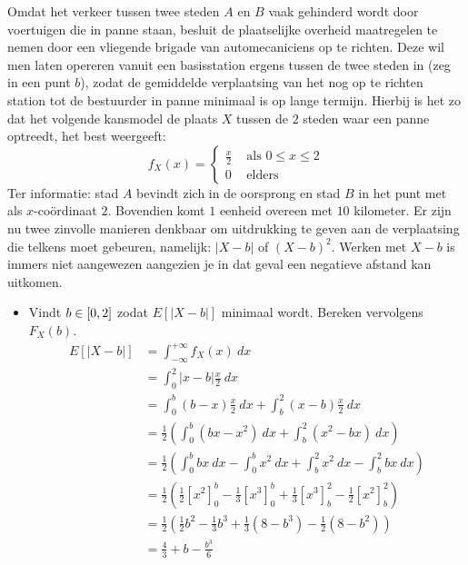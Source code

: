 \documentclass[main.tex]{subfiles}
\begin{document}
\begin{oef}
  Omdat het verkeer tussen twee steden $A$ en $B$ vaak gehinderd wordt door voertuigen die in panne staan, besluit de plaatselijke overheid maatregelen te nemen door een vliegende brigade van automecaniciens op te richten.
  Deze wil men laten opereren vanuit een basisstation ergens tussen de twee steden in (zeg in een punt $b$), zodat de gemiddelde verplaatsing van het nog op te richten station tot de bestuurder in panne minimaal is op lange termijn.
  Hierbij is het zo dat het volgende kansmodel de plaats $X$ tussen de $2$ steden waar een panne optreedt, het best weergeeft:
  \[
  f_{X}(x) = 
  \left\{
    \begin{array}{rl}
      \frac{x}{2} & \text{ als } 0 \le x \le 2\\
      0 & \text{ elders }
    \end{array}
  \right.
  \]
  Ter informatie: stad $A$ bevindt zich in de oorsprong en stad $B$ in het punt met als $x$-co\"ordinaat $2$.
  Bovendien komt $1$ eenheid overeen met $10$ kilometer.
  Er zijn nu twee zinvolle manieren denkbaar om uitdrukking te geven aan de verplaatsing die telkens moet gebeuren, namelijk: $|X-b|$ of $(X-b)^{2}$.
  Werken met $X-b$ is immers niet aangewezen aangezien je in dat geval een negatieve afstand kan uitkomen.
  \begin{itemize}
  \item Vindt $b \in \interval{0}{2}$ zodat $E[|X-b|]$ minimaal wordt.
    Bereken vervolgens $F_{X}(b)$.
    \[
    \begin{array}{rl}
      E[|X-b|]
      &= \int_{-\infty}^{+\infty}f_{X}(x)\ dx\\
      &= \int_{0}^{2}|x-b|\frac{x}{2}\ dx\\
      &= \int_{0}^{b}(b-x)\frac{x}{2}\ dx + \int_{b}^{2}(x-b)\frac{x}{2}\ dx\\
      &= \frac{1}{2}\left(\int_{0}^{b}(bx-x^{2})\ dx + \int_{b}^{2}(x^{2}-bx)\ dx\right)\\
      &= \frac{1}{2}\left(\int_{0}^{b}bx\ dx-\int_{0}^{b}x^{2}\ dx + \int_{b}^{2}x^{2}\ dx-\int_{b}^{2}bx\ dx\right)\\
      &=\frac{1}{2}\left(\frac{1}{2}[x^{2}]_{0}^{b}-\frac{1}{3}[x^{3}]_{0}^{b} + \frac{1}{3}[x^{3}]_{b}^{2}-\frac{1}{2}[x^{2}]_{b}^{2}\right)\\
      &= \frac{1}{2}\left(\frac{1}{2}b^{2}-\frac{1}{3}b^{3} + \frac{1}{3}(8-b^{3})-\frac{1}{2}(8-b^{2})\right)\\
      &= \frac{4}{3} + b - \frac{b^{3}}{6}\\

\end{array}\]
\end{itemize}
\end{oef}
\end{document}
